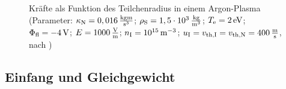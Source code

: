 \documentclass[numbers=noenddot,a4paper,notitlepage,twoside,BCOR15mm]{scrbook}
\newcommand{\tenpo}[1]{ 10^{#1}}
\newcommand{\ix}[1]{_\text{#1}}
\begin{document}
\begin{figure}[!t]
\begin{subfigure}[t]{0.49\textwidth}
					\caption{}
					\label{img:rechtseq}
				\end{subfigure}
				\caption{Kräfte als Funktion des Teilchenradius in einem Argon-Plasma (Parameter: $\kappa\ix{N}=\unit[0,016]{\frac{kg m}{s^3}}$;  \mbox{$\rho\ix{S}=\unit[1,5\cdot\tenpo{3}]{\frac{kg}{m^3}}$}; $T\ix{e}=\unit[2]{eV}$; $\Phi\ix{fl}=\unit[-4]{V}$; $E=\unit[1000]{\frac{V}{m}}$; $n\ix{I}=\unit[\tenpo{15}]{m^{-3}}$; $u\ix{I}=v\ix{th,I}=v\ix{th,N}=\unit[400]{\frac{m}{s}}$, nach \cite{Melzer12}) }
				\label{img:kräfte}
			\end{figure}

		\subsection{Einfang und Gleichgewicht}\label{subub:einfang}
\end{document}
